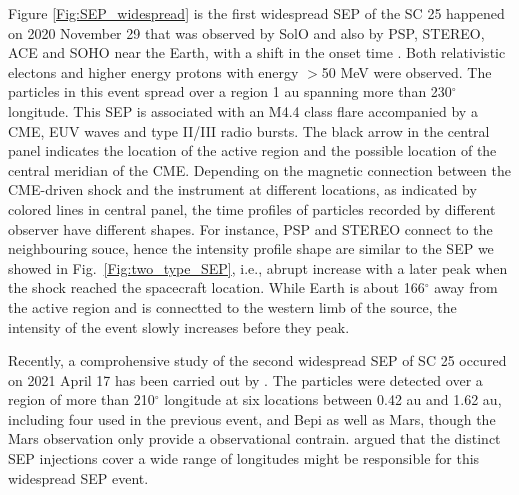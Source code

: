 Figure \ref{Fig:SEP_widespread} is the first widespread \ac{SEP} of the \ac{SC} 25 happened on 2020 November 29 that was observed by \ac{SolO} and also by \ac{PSP}, \ac{STEREO}, \ac{ACE} and \ac{SOHO} near the Earth, with a shift in the onset time \citep{Kolhoff2021AA, Kouloumvakos2022AA, Palmerio2022SpWea}. Both relativistic electons and higher energy protons with energy $>$50 MeV were observed. The particles in this event spread over a region 1 au spanning more than 230$^\circ$ longitude. This SEP is associated with an M4.4 class flare accompanied by a \ac{CME}, \ac{EUV} waves and type II/III radio bursts. The black arrow in the central panel indicates the location of the active region and the possible location of the central meridian of the \ac{CME}.  Depending on the magnetic connection between the \ac{CME}-driven shock and the instrument at different locations, as indicated by colored lines in central panel, the time profiles of particles recorded by different observer have different shapes. For instance, \ac{PSP} and \ac{STEREO} connect to the neighbouring souce, hence the intensity profile shape are similar to the \ac{SEP} we showed in Fig.~\ref{Fig:two_type_SEP}, i.e., abrupt increase with a later peak when the shock reached the spacecraft location. While Earth is about 166$^\circ$ away from the active region and is connectted to the western limb of the source, the intensity of the event slowly increases before they peak.

Recently, a comprohensive study of the second widespread \ac{SEP} of \ac{SC} 25 occured on 2021 April 17 has been carried out by \citet{dresing202317}. The particles were detected over a region of more than 210$^\circ$ longitude at six locations between 0.42 au and 1.62 au, including four used in the previous event, and \ac{Bepi} as well as Mars, though the Mars observation only provide a observational contrain. \citet{dresing202317} argued that the distinct SEP injections cover a wide range of longitudes might be responsible for this widespread SEP event.

